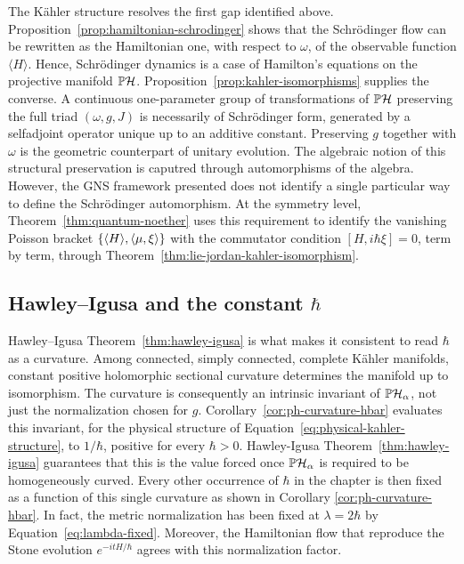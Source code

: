 The Kähler structure resolves the first gap identified above. Proposition~\ref{prop:hamiltonian-schrodinger} shows that the Schrödinger flow can be rewritten as the Hamiltonian one, with respect to $\omega$, of the observable function $\langle H\rangle$. Hence, Schrödinger dynamics is a case of Hamilton's equations on the projective manifold $\PH$. Proposition~\ref{prop:kahler-isomorphisms} supplies the converse. A continuous one-parameter group of transformations of $\PH$ preserving the full triad $(\omega,g,J)$ is necessarily of Schrödinger form, generated by a selfadjoint operator unique up to an additive constant. Preserving $g$ together with $\omega$ is the geometric counterpart of unitary evolution. The algebraic notion of this structural preservation is caputred through automorphisms of the algebra. However, the GNS framework presented does not identify a single particular way to define the Schrödinger automorphism. At the symmetry level, Theorem~\ref{thm:quantum-noether} uses this requirement to identify the vanishing Poisson bracket $\{\langle H\rangle,\langle\mu,\xi\rangle\}$ with the commutator condition $[H,i\hbar\xi]=0$, term by term, through Theorem~\ref{thm:lie-jordan-kahler-isomorphism}.

\subsection*{Hawley--Igusa and the constant $\hbar$}
Hawley--Igusa Theorem~\ref{thm:hawley-igusa} is what makes it consistent to read $\hbar$ as a curvature. Among connected, simply connected, complete Kähler manifolds, constant positive holomorphic sectional curvature determines the manifold up to isomorphism. The curvature is consequently an intrinsic invariant of $\PH_\alpha$, not just the normalization chosen for $g$. Corollary~\ref{cor:ph-curvature-hbar} evaluates this invariant, for the physical structure of Equation~\eqref{eq:physical-kahler-structure}, to $1/\hbar$, positive for every $\hbar>0$. Hawley-Igusa Theorem~\ref{thm:hawley-igusa} guarantees that this is the value forced once $\PH_\alpha$ is required to be homogeneously curved. Every other occurrence of $\hbar$ in the chapter is then fixed as a function of this single curvature as shown in Corollary \ref{cor:ph-curvature-hbar}. In fact, the metric normalization has been fixed at $\lambda=2\hbar$ by Equation~\eqref{eq:lambda-fixed}. Moreover, the Hamiltonian flow that reproduce the Stone evolution $e^{-itH/\hbar}$ agrees with this normalization factor. 

